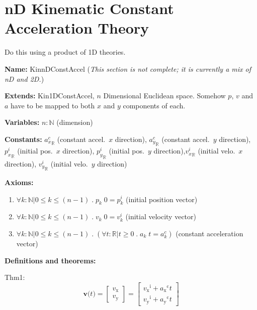 \documentclass{article}
\begin{document}
\section{nD Kinematic Constant Acceleration Theory}

Do this using a product of 1D theories.

\noindent \textbf{Name:} KinnDConstAccel (\textit{This section is not complete;
it is currently a mix of nD and 2D.})

\noindent \textbf{Extends:} Kin1DConstAccel, $n$ Dimensional Euclidean space.  Somehow $p$, $v$ and $a$
have to be mapped to both $x$ and $y$ components of each.

\noindent \textbf{Variables:} $n: {\mathbb{N}}$ (dimension)

\noindent \textbf{Constants:} ${a_x^c}_{\mathbb{R}}$ (constant accel.\ $x$
direction), ${a_y^c}_{\mathbb{R}}$ (constant accel.\ $y$ direction),
${p_x^i}_{\mathbb{R}}$ (initial pos.\ $x$ direction), ${p_y^i}_{\mathbb{R}}$
(initial pos.\ $y$ direction),${v_x^i}_{\mathbb{R}}$ (initial velo.\ $x$
direction), ${v_y^i}_{\mathbb{R}}$ (initial velo.\ $y$ direction) 

\noindent \textbf{Axioms:}

\begin{enumerate}
    \item $\forall k: \mathbb{N} | 0 \leq k \leq (n-1) \; . \; p_k \; 0 = p_k^i$ (initial position vector)
    \item $\forall k: \mathbb{N} | 0 \leq k \leq (n-1) \; . \; v_k \; 0 = v_k^i$ (initial velocity vector)
    \item $\forall k: \mathbb{N} | 0 \leq k \leq (n-1) \; . \; (\forall t:
    \mathbb{R} | t \geq 0 \; . \; a_k \; t = a_k^c)$ (constant acceleration vector)
\end{enumerate}

\noindent \textbf{Definitions and theorems:}

Thm1: \begin{displaymath}
    \mathbf{v}\text{(}t\text{)}=\begin{bmatrix}
        v_\text{x}\\
        v_\text{y}
        \end{bmatrix} =\begin{bmatrix}
                               {{v_{\text{x}}}^{\text{i}}}+{{a_{\text{x}}}^{\text{c}}} t\\
                               {{v_{\text{y}}}^{\text{i}}}+{{a_{\text{y}}}^{\text{c}}} t
                               \end{bmatrix}
    \end{displaymath}
\end{document}
